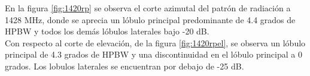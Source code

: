 



En la figura \ref{fig:1420rp} se observa el corte azimutal del patrón de radiación a 1428 MHz, donde se aprecia un lóbulo principal predominante de 4.4 grados de HPBW y todos los demás lóbulos laterales bajo -20 dB.\\


Con respecto al corte de elevación, de la figura \ref{fig:1420rpel}, se observa un lóbulo principal de 4.3 grados de HPBW y una discontinuidad en el lóbulo principal a 0 grados. Los lobulos laterales  se encuentran por debajo de -25 dB.\\



